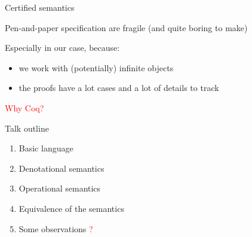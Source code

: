 \documentclass{beamer}
\theoremstyle{definition}
\theoremstyle{plain} %
\begin{document}
\begin{frame}{Certified semantics}

Pen-and-paper specification are fragile (and quite boring to make)

\vskip5mm

Especially in our case, because:
\begin{itemize}
\item we work with (potentially) infinite objects
\item the proofs have a lot cases and a lot of details to track
\end{itemize}

\vskip8mm

\textcolor{red}{Why Coq?}

\end{frame}



\begin{frame}{Talk outline}

\begin{enumerate}
  \item Basic language 
  \vskip6mm
  \item Denotational semantics 
  \vskip6mm
  \item Operational semantics 
  \vskip6mm
  \item Equivalence of the semantics 
  \vskip6mm
  \item Some observations \textcolor{red}{?}
\end{enumerate}

\end{frame}
\end{document}
